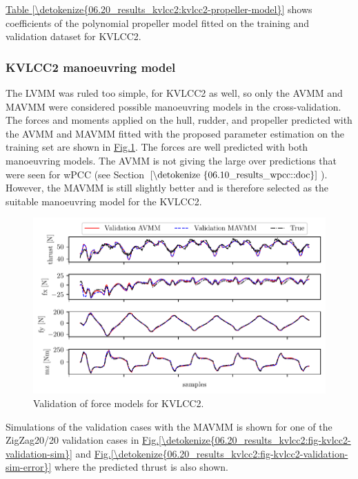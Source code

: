 \sphinxAtStartPar
\noindent \hyperref[\detokenize{06.20_results_kvlcc2:kvlcc2-propeller-model}]{Table \ref{\detokenize{06.20_results_kvlcc2:kvlcc2-propeller-model}}} shows coefficients of the polynomial propeller model fitted on the training and validation dataset for KVLCC2.


\subsubsection{KVLCC2 manoeuvring model}
\label{\detokenize{06.20_results_kvlcc2:kvlcc2-manoeuvring-model}}
\sphinxAtStartPar
The LVMM was ruled too simple, for KVLCC2 as well, so only the AVMM and MAVMM were considered possible manoeuvring models in the cross-validation.
The forces and moments applied on the hull, rudder, and propeller predicted with the AVMM and MAVMM fitted with the proposed parameter estimation on the training set are shown in \hyperref[\detokenize{06.20_results_kvlcc2:fig-kvlcc2-validation-forces}]{Fig.\@ \ref{\detokenize{06.20_results_kvlcc2:fig-kvlcc2-validation-forces}}}.
The forces are well predicted with both manoeuvring models. The AVMM is not giving the large over predictions that were seen for wPCC (see Section \(\ref{\detokenize{06.10_results_wpcc::doc}}\)). However, the MAVMM is still slightly better and is therefore selected as the suitable manoeuvring model for the KVLCC2.

\begin{figure}[!htb]
\centering
\includegraphics{kappa/images/13.pdf}
\caption{Validation of force models for KVLCC2.}\label{\detokenize{06.20_results_kvlcc2:fig-kvlcc2-validation-forces}}\end{figure}

\sphinxAtStartPar
Simulations of the validation cases with the MAVMM is shown for one of the ZigZag20/20 validation cases in \hyperref[\detokenize{06.20_results_kvlcc2:fig-kvlcc2-validation-sim}]{Fig.\@ \ref{\detokenize{06.20_results_kvlcc2:fig-kvlcc2-validation-sim}}} and \hyperref[\detokenize{06.20_results_kvlcc2:fig-kvlcc2-validation-sim-error}]{Fig.\@ \ref{\detokenize{06.20_results_kvlcc2:fig-kvlcc2-validation-sim-error}}} where the predicted thrust is also shown.

